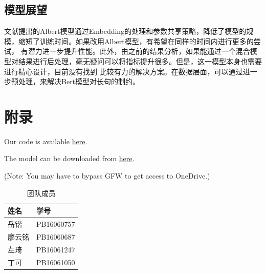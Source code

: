 \documentclass[11pt]{article}
\begin{document}
\subsection{模型展望}
文献\cite{2019albert}提出的Albert模型通过Embedding的处理和参数共享策略，降低了模型的规模，缩短了训练时间。如果改用Albert模型，有希望在同样的时间内进行更多的尝试，%
有潜力进一步提升性能。此外，由之前的结果分析，如果能通过一个混合模型对结果进行后处理，毫无疑问可以将指标提升很多。但是，这一模型本身也需要进行精心设计，目前没有找到%
比较有力的解决方案。在数据层面，可以通过进一步预处理，来解决Bert模型对长句的制约。




\section{附录}\label{code}
Our code is available \href{https://github.com/KAI-YUE/Financial-Entities-Recognition}{here}.\par
The model can be downloaded from \href{https://1drv.ms/u/s!AnzT-wEe9-ARgk4FviqmTab3qyCL?e=sSZOuU}{here}.\par
(Note: You may have to bypass GFW to get access to OneDrive.)

\tabcolsep=20pt
\begin{table}[!ht]
    \centering
    \begin{tabular}{ll}
        \toprule
        姓名  &  学号 \\    \midrule
        岳锴  &  PB16060757 \\
        廖云铭 & PB16060687 \\
        左琦  &  PB16061247 \\
        丁可  &  PB16061050 \\  \bottomrule
    \end{tabular}
    \caption{团队成员}
\end{table}
\end{document}
